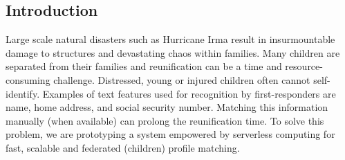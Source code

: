 \documentclass[sigconf]{acmart}
\begin{document}
\begin{titlepage}
%
%


\maketitle
\section{Introduction}
\label{sec:intro}

\vspace*{-4pt}
Large scale natural disasters such as Hurricane Irma result in insurmountable damage to structures and devastating chaos within families. Many children are separated from their families and reunification can be a time and resource-consuming challenge. Distressed, young or injured children often cannot self-identify. Examples of text features used for recognition by first-responders are  name, home address, and social security number. Matching this information manually (when available) can prolong the reunification time. 
%
To solve this problem, we are prototyping a system empowered by serverless computing for fast, scalable and federated (children) profile matching. 
%

\end{titlepage}
\end{document}
